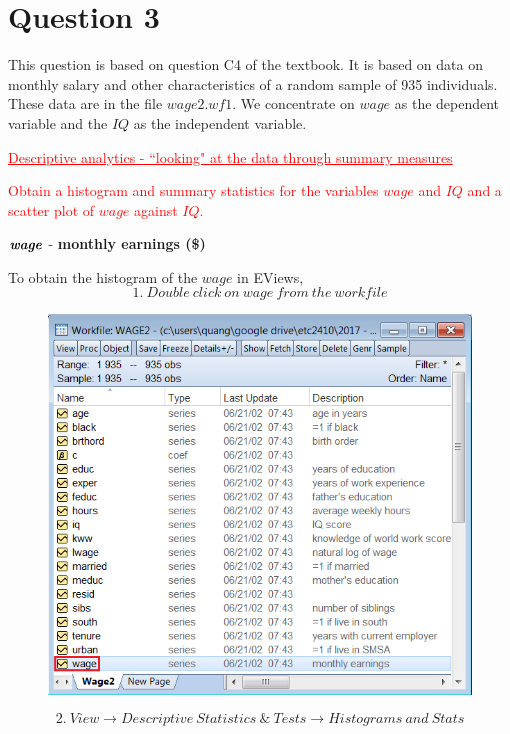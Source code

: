 \documentclass[12pt]{report}
\begin{document}
\newpage
\section*{Question 3}
\noindent This question is based on question C4 of the textbook. It is based on data on monthly salary and other characteristics of a random sample of 935 individuals. These data are in the file $wage2.wf1$. We concentrate on $wage$ as the dependent variable and the $IQ$ as the independent variable.

\noindent \textcolor{red}{\underline{Descriptive analytics - ``looking" at the data through summary measures}}

\noindent \textcolor{red}{Obtain a histogram and summary statistics for the variables $wage$ and $IQ$ and a scatter plot of $wage$ against $IQ$.}
\begin{center}
\noindent $\textbf{\textit{wage}}$ - \textbf{monthly earnings (\$)}
\end{center}
\noindent To obtain the histogram of the $wage$ in EViews,
$$1.\ Double\ click\ on\ wage\ from\ the\ workfile$$
\begin{figure}[H]
\centering
\includegraphics{q3_1}
\end{figure}
\vspace{-\baselineskip}
$$2.\ View \to Descriptive\ Statistics\ \&\ Tests \to Histograms\ and\ Stats$$
\end{document}
